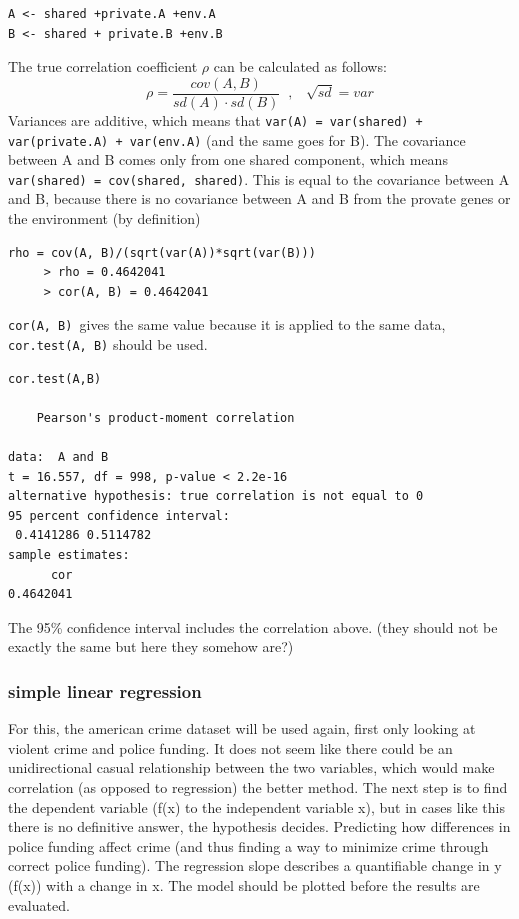\documentclass{article}
\begin{document}
\begin{lstlisting}
A <- shared +private.A +env.A
B <- shared + private.B +env.B
\end{lstlisting}
The true correlation coefficient $\rho$ can be calculated as follows: $$\rho = \frac{cov(A, B)}{sd(A) \cdot sd(B)} \;\; , \;\;\; \sqrt{sd} = var$$
Variances are additive, which means that \texttt{var(A) = var(shared) + var(private.A) + var(env.A)} (and the same goes for B). The covariance between A and B comes only from one shared component, which means \texttt{var(shared) = cov(shared, shared)}. This is equal to the covariance between A and B, because there is no covariance between A and B from the provate genes or the environment (by definition)
\begin{lstlisting}
rho = cov(A, B)/(sqrt(var(A))*sqrt(var(B)))
     > rho = 0.4642041
     > cor(A, B) = 0.4642041 
\end{lstlisting}

\texttt{cor(A, B) }gives the same value because it is applied to the same data, \texttt{cor.test(A, B)} should be used.

\begin{lstlisting}
cor.test(A,B)

	Pearson's product-moment correlation

data:  A and B
t = 16.557, df = 998, p-value < 2.2e-16
alternative hypothesis: true correlation is not equal to 0
95 percent confidence interval:
 0.4141286 0.5114782
sample estimates:
      cor 
0.4642041  
\end{lstlisting}

The 95\% confidence interval includes the correlation above. (they should not be exactly the same but here they somehow are?)

\subsubsection{simple linear regression}
For this, the american crime dataset will be used again, first only looking at violent crime and police funding. It does not seem like there could be an unidirectional casual relationship between the two variables, which would make correlation (as opposed to regression) the better method. The next step is to find the dependent variable (f(x) to the independent variable x), but in cases like this there is no definitive answer, the hypothesis decides. Predicting how differences in police funding affect crime (and thus finding a way to minimize crime through correct police funding). The regression slope describes a quantifiable change in y (f(x)) with a change in x. The model should be plotted before the results are evaluated.
\end{document}
